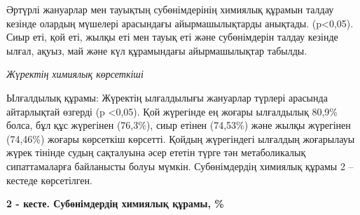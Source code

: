 \begin{multicols}{2}
Әртүрлі жануарлар мен тауықтың субөнімдерінің химиялық құрамын талдау
кезінде олардың мүшелері арасындағы айырмашылықтарды анықтады.
(p\textless0,05). Сиыр еті, қой еті, жылқы еті мен тауық еті және
субөнімдерін талдау кезінде ылғал, ақуыз, май және күл құрамындағы
айырмашылықтар табылды.

\emph{Жүректің химиялық көрсеткіші}

Ылғалдылық құрамы: Жүректің ылғалдылығы жануарлар түрлері арасында
айтарлықтай өзгерді (p \textless0,05). Қой жүрегінде ең жоғары
ылғалдылық 80,9\% болса, бұл құс жүрегінен (76,3\%), сиыр етінен
(74,53\%) және жылқы жүрегінен (74,46\%) жоғары көрсеткіш көрсетті.
Қойдың жүрегіндегі ылғалдың жоғарылауы жүрек тінінде судың сақталуына
әсер ететін түрге тән метаболикалық сипаттамаларға байланысты болуы
мүмкін. Субөнімдердің химиялық құрамы 2 -- кестеде көрсетілген.
\end{multicols}

{\bfseries 2 - кесте. Субөнімдердің химиялық құрамы, \%}

